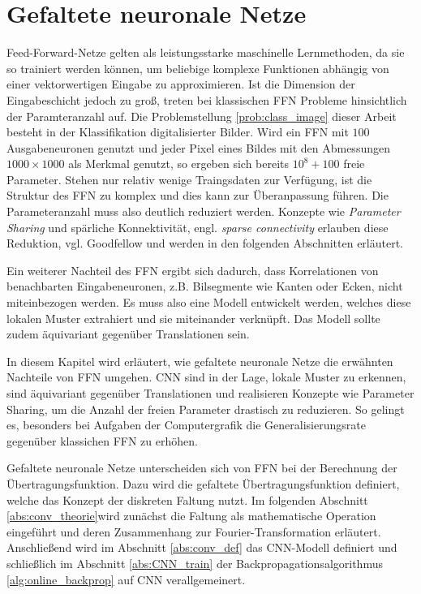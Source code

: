 \chapter{Gefaltete neuronale Netze}
\label{kap:CNN}

Feed-Forward-Netze gelten als leistungsstarke maschinelle Lernmethoden, da sie so trainiert werden können, um beliebige komplexe Funktionen abhängig von einer vektorwertigen Eingabe zu approximieren. Ist die Dimension der Eingabeschicht jedoch zu groß, treten bei klassischen FFN Probleme hinsichtlich der Paramteranzahl auf. Die Problemstellung \ref{prob:class_image} dieser Arbeit besteht in der Klassifikation digitalisierter Bilder. Wird ein FFN mit $100$ Ausgabeneuronen genutzt und jeder Pixel eines Bildes mit den Abmessungen $1000 \times 1000$ als Merkmal genutzt, so ergeben sich bereits $10^8+100$ freie Parameter. Stehen nur relativ wenige Traingsdaten zur Verfügung, ist die Struktur des FFN zu komplex und dies kann zur Überanpassung führen\cite{caruana2000overfitting,bilbao2017overfitting}. Die Parameteranzahl muss also deutlich reduziert werden. Konzepte wie \textit{Parameter Sharing} und spärliche Konnektivität, engl. \textit{sparse connectivity} erlauben diese Reduktion, vgl. Goodfellow\cite{Goodfellow-et-al-2016} und werden in den folgenden Abschnitten erläutert.

Ein weiterer Nachteil des FFN ergibt sich dadurch, dass Korrelationen von benachbarten Eingabeneuronen, z.B. Bilsegmente wie Kanten oder Ecken, nicht miteinbezogen werden. Es muss also eine Modell entwickelt werden, welches diese lokalen Muster extrahiert und sie miteinander verknüpft. Das Modell sollte zudem äquivariant gegenüber Translationen sein. 


In diesem Kapitel wird erläutert, wie gefaltete neuronale Netze die erwähnten Nachteile von FFN umgehen. CNN sind in der Lage, lokale Muster zu erkennen, sind äquivariant gegenüber Translationen und realisieren Konzepte wie Parameter Sharing, um die Anzahl der freien Parameter drastisch zu reduzieren. So gelingt es, besonders bei Aufgaben der Computergrafik\cite{DBLP:conf/nips/KrizhevskySH12, DBLP:journals/pieee/LeCunBBH98,DBLP:conf/cvpr/CiresanMS12} die Generalisierungsrate gegenüber klassichen FFN zu erhöhen. 

Gefaltete neuronale Netze unterscheiden sich von FFN bei der Berechnung der Übertragungsfunktion. Dazu wird die gefaltete Übertragungsfunktion definiert, welche das Konzept der diskreten Faltung nutzt. Im folgenden Abschnitt \ref{abs:conv_theorie}wird zunächst die Faltung als mathematische Operation eingeführt und deren Zusammenhang zur Fourier-Transformation\cite{werner2011funktionalanalysis} erläutert. Anschließend wird im Abschnitt \ref{abs:conv_def} das CNN-Modell definiert und schließlich im Abschnitt \ref{abs:CNN_train} der Backpropagationsalgorithmus \ref{alg:online_backprop} auf CNN verallgemeinert.

